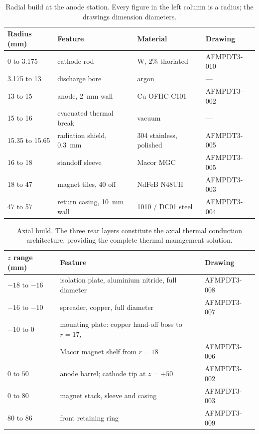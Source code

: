 \documentclass[11pt,a4paper]{article}
\begin{document}
\begin{table}[H]
\centering
\caption{Radial build at the anode station. Every figure in the left column is
a radius; the drawings dimension diameters.}
\label{tab:radial}
\begin{tabular}{llll}
\toprule
\textbf{Radius (mm)} & \textbf{Feature} & \textbf{Material} & \textbf{Drawing} \\
\midrule
0 to 3.175   & cathode rod                    & W, 2\% thoriated      & AFMPDT3-010 \\
3.175 to 13  & discharge bore                 & argon                 & --- \\
13 to 15     & anode, 2~mm wall               & Cu OFHC C101          & AFMPDT3-002 \\
15 to 16     & evacuated thermal break        & vacuum                & --- \\
15.35 to 15.65 & radiation shield, 0.3~mm     & 304 stainless, polished & AFMPDT3-005 \\
16 to 18     & standoff sleeve                & Macor MGC             & AFMPDT3-005 \\
18 to 47     & magnet tiles, 40 off           & NdFeB N48UH           & AFMPDT3-003 \\
47 to 57     & return casing, 10~mm wall      & 1010 / DC01 steel     & AFMPDT3-004 \\
\bottomrule
\end{tabular}
\end{table}

\begin{table}[H]
\centering
\caption{Axial build. The three rear layers constitute the axial thermal conduction architecture, providing the complete thermal management solution.}
\label{tab:axial}
\begin{tabular}{lll}
\toprule
\textbf{$z$ range (mm)} & \textbf{Feature} & \textbf{Drawing} \\
\midrule
$-18$ to $-16$ & isolation plate, aluminium nitride, full diameter & AFMPDT3-008 \\
$-16$ to $-10$ & spreader, copper, full diameter                   & AFMPDT3-007 \\
$-10$ to $0$   & mounting plate: copper hand-off boss to $r = 17$, &  \\
               & \phantom{mounting plate: }Macor magnet shelf from $r = 18$ & AFMPDT3-006 \\
$0$ to $50$    & anode barrel; cathode tip at $z = +50$            & AFMPDT3-002 \\
$0$ to $80$    & magnet stack, sleeve and casing                   & AFMPDT3-003 \\
$80$ to $86$   & front retaining ring                              & AFMPDT3-009 \\
\bottomrule
\end{tabular}
\end{table}
\end{document}
